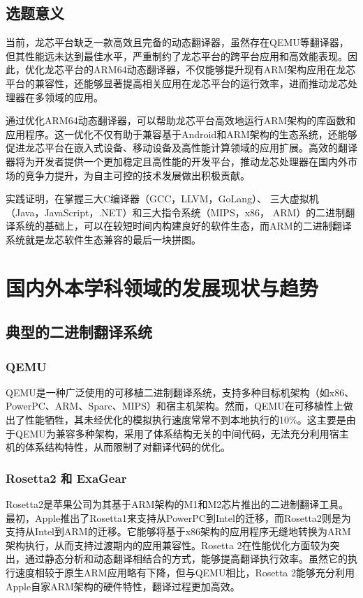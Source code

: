\subsection{选题意义}

当前，龙芯平台缺乏一款高效且完备的动态翻译器，虽然存在QEMU等翻译器，但其性能远未达到最佳水平，严重制约了龙芯平台的跨平台应用和高效能表现。因此，优化龙芯平台的ARM64动态翻译器，不仅能够提升现有ARM架构应用在龙芯平台的兼容性，还能够显著提高相关应用在龙芯平台的运行效率，进而推动龙芯处理器在多领域的应用。

通过优化ARM64动态翻译器，可以帮助龙芯平台高效地运行ARM架构的库函数和应用程序。这一优化不仅有助于兼容基于Android和ARM架构的生态系统，还能够促进龙芯平台在嵌入式设备、移动设备及高性能计算领域的应用扩展。高效的翻译器将为开发者提供一个更加稳定且高性能的开发平台，推动龙芯处理器在国内外市场的竞争力提升，为自主可控的技术发展做出积极贡献。

实践证明，在掌握三大C编译器（GCC，LLVM，GoLang）、 三大虚拟机（Java，JavaScript，.NET）和三大指令系统（MIPS，x86， ARM）的二进制翻译系统的基础上，可以在较短时间内构建良好的软件生态，而ARM的二进制翻译系统就是龙芯软件生态兼容的最后一块拼图。



\section{国内外本学科领域的发展现状与趋势}
\subsection{典型的二进制翻译系统}
\subsubsection{QEMU}
QEMU是一种广泛使用的可移植二进制翻译系统，支持多种目标机架构（如x86、PowerPC、ARM、Sparc、MIPS）和宿主机架构。然而，QEMU在可移植性上做出了性能牺牲，其未经优化的模拟执行速度常常不到本地执行的10{\%}。这主要是由于QEMU为兼容多种架构，采用了体系结构无关的中间代码，无法充分利用宿主机的体系结构特性，从而限制了对翻译代码的优化。
\subsubsection{Rosetta2 和 ExaGear}
Rosetta2是苹果公司为其基于ARM架构的M1和M2芯片推出的二进制翻译工具。最初，Apple推出了Rosetta1来支持从PowerPC到Intel的迁移，而Rosetta2则是为支持从Intel到ARM的迁移。它能够将基于x86架构的应用程序无缝地转换为ARM架构执行，从而支持过渡期内的应用兼容性。Rosetta 2在性能优化方面较为突出，通过静态分析和动态翻译相结合的方式，能够提高翻译执行效率。虽然它的执行速度相较于原生ARM应用略有下降，但与QEMU相比，Rosetta 2能够充分利用Apple自家ARM架构的硬件特性，翻译过程更加高效。

